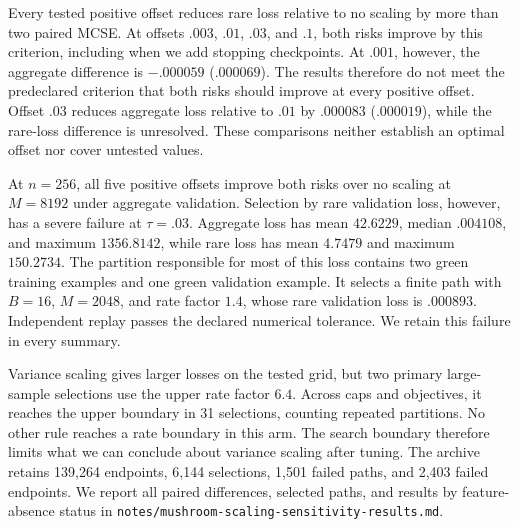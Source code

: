 Every tested positive offset reduces rare loss relative to no scaling by more
than two paired MCSE. At offsets $.003$, $.01$, $.03$, and $.1$, both risks
improve by this criterion, including when we add stopping checkpoints. At
$.001$, however, the aggregate difference is $-.000059$ ($.000069$). The
results therefore do not meet the predeclared criterion that both risks should
improve at every positive offset. Offset $.03$ reduces aggregate loss relative
to $.01$ by $.000083$ ($.000019$), while the rare-loss difference is
unresolved. These comparisons neither establish an optimal offset nor cover
untested values.

At $n = 256$, all five positive offsets improve both risks over no scaling at
$M = 8192$ under aggregate validation. Selection by rare validation loss,
however, has a severe failure at $\tau = .03$. Aggregate loss has mean
$42.6229$, median $.004108$, and maximum $1356.8142$, while rare loss has
mean $4.7479$ and maximum $150.2734$. The partition responsible for most of
this loss contains two green training examples and one green validation example.
It selects a finite path with $B = 16$, $M = 2048$, and rate factor $1.4$,
whose rare validation loss is $.000893$. Independent replay passes the declared
numerical tolerance. We retain this failure in every summary.

Variance scaling gives larger losses on the tested grid, but two primary
large-sample selections use the upper rate factor $6.4$. Across caps and
objectives, it reaches the upper boundary in 31 selections, counting repeated
partitions. No other rule reaches a rate boundary in this arm. The search
boundary therefore limits what we can conclude about variance scaling after
tuning. The archive retains 139,264 endpoints, 6,144 selections, 1,501 failed
paths, and 2,403 failed endpoints. We report all paired differences, selected
paths, and results by feature-absence status in
\texttt{notes/mushroom-scaling-sensitivity-results.md}.
